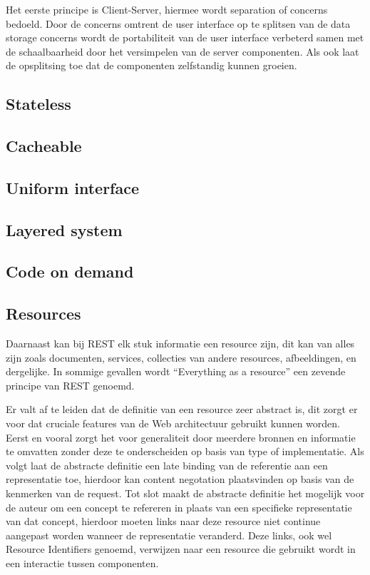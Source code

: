 Het eerste principe is Client-Server, hiermee wordt separation of concerns bedoeld. Door de concerns omtrent de user interface op te splitsen van de data storage concerns wordt de portabiliteit van de user interface verbeterd samen met de schaalbaarheid door het versimpelen van de server componenten. Als ook laat de opsplitsing toe dat de componenten zelfstandig kunnen groeien.
\subsection{Stateless}
\label{subsec:Stateless}

\subsection{Cacheable}
\label{subsec:Cacheable}

\subsection{Uniform interface}
\label{subsec:Uniform interface}

\subsection{Layered system}
\label{subsec:Layered system}

\subsection{Code on demand}
\label{subsec:Code on demand}

\subsection{Resources}
\label{subsec:Resources}
Daarnaast kan bij REST elk stuk informatie een resource zijn, dit kan van alles zijn zoals documenten, services, collecties van andere resources, afbeeldingen, en dergelijke. In sommige gevallen wordt “Everything as a resource”  een zevende principe van REST genoemd. 

Er valt af te leiden dat de definitie van een resource zeer abstract is, dit zorgt er voor dat cruciale features van de Web architectuur gebruikt kunnen worden. Eerst en vooral zorgt het voor generaliteit door meerdere bronnen en informatie te omvatten zonder deze te onderscheiden op basis van type of implementatie. Als volgt laat de abstracte definitie een late binding van de referentie aan een representatie toe, hierdoor kan content negotation plaatsvinden op basis van de kenmerken van de request. Tot slot maakt de abstracte definitie het mogelijk voor de auteur om een concept te refereren in plaats van een specifieke representatie van dat concept, hierdoor moeten links naar deze resource niet continue aangepast worden wanneer de representatie veranderd.
Deze links, ook wel Resource Identifiers genoemd, verwijzen naar een resource die gebruikt wordt in een interactie tussen componenten.

